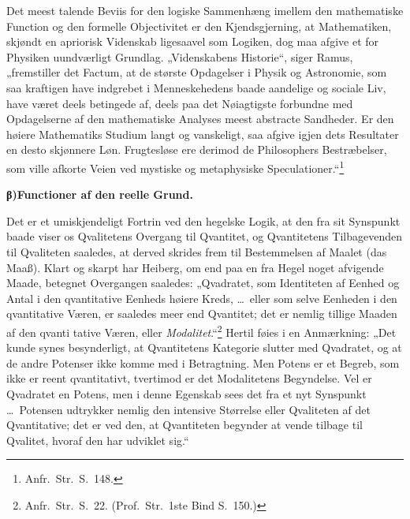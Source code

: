 \documentclass[12pt]{book}
\newcommand{\opage}[1]{\marginnote{\footnotesize\textit{[#1]}}}
\begin{document}
Det meest talende Beviis for den logiske Sammenhæng imellem den mathematiske Function og den formelle
Objectivitet er den Kjendsgjerning, at Mathematiken, skjøndt en apriorisk Videnskab ligesaavel som
Logiken, dog maa afgive et for Physiken uundværligt Grundlag. „Videnskabens Historie“, siger Ramus,
„fremstiller det Factum, at de største Opdagelser i Physik og Astronomie, som saa kraftigen have
indgrebet i Menneskehedens baade aandelige og sociale Liv, have været deels betingede af, deels paa det
Nøiagtigste forbundne med Opdagelserne af den mathematiske Analyses meest abstracte Sandheder. Er den
høiere Mathematiks Studium langt og vanskeligt, saa afgive igjen dets Resultater en desto skjønnere Løn.
Frugtesløse ere derimod de Philosophers Bestræbelser, som ville afkorte Veien ved mystiske og
metaphysiske Speculationer.“\footnote{Anfr.\ Str.\ S.~148.}

\begin{center}{\bfseries β)\quad Functioner af den reelle Grund.}\end{center}

Det er et umiskjendeligt Fortrin ved den hegelske Logik, at den fra sit Synspunkt baade viser os
Qvalitetens Overgang til Qvantitet, og Qvantitetens Tilbagevenden til Qvaliteten saaledes, at derved
skrides frem til Bestemmelsen af Maalet (das Maaß). Klart og skarpt har Heiberg, om end paa en fra Hegel
noget afvigende Maade, betegnet Overgangen saaledes: „Qvadratet, som Identiteten af Eenhed og Antal i
den qvantitative Eenheds høiere Kreds, \ldots\ eller som selve Eenheden i den qvantitative Væren, er
saaledes meer end Qvantitet; det er nemlig tillige Maaden af den qvanti%
\opage{302} tative Væren, eller \emph{Modalitet}.“\footnote{Anfr.\ Str.\ S.~22. (Prof.\ Str.\ 1ste Bind S.~150.)}
Hertil føies i en Anmærkning: „Det kunde synes besynderligt, at Qvantitetens Kategorie slutter med
Qvadratet, og at de andre Potenser ikke komme med i Betragtning. Men Potens er et Begreb, som ikke er
reent qvantitativt, tvertimod er det Modalitetens Begyndelse. Vel er Qvadratet en Potens, men i denne
Egenskab sees det fra et nyt Synspunkt \ldots\ Potensen udtrykker nemlig den intensive Størrelse eller
Qvaliteten af det Qvantitative; det er ved den, at Qvantiteten begynder at vende tilbage til Qvalitet,
hvoraf den har udviklet sig.“
\end{document}
